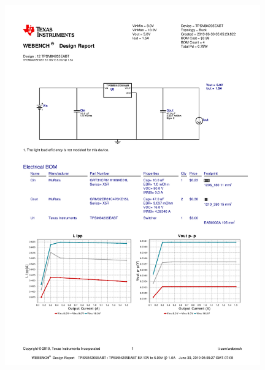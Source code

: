 \documentclass[a4paper, 11pt]{article} %
\begin{document}
\begin{figure}[H]
    \centering
    \includegraphics[width = 0.98\textwidth]{wb_report_cover.pdf}
\end{figure}



\end{document}
